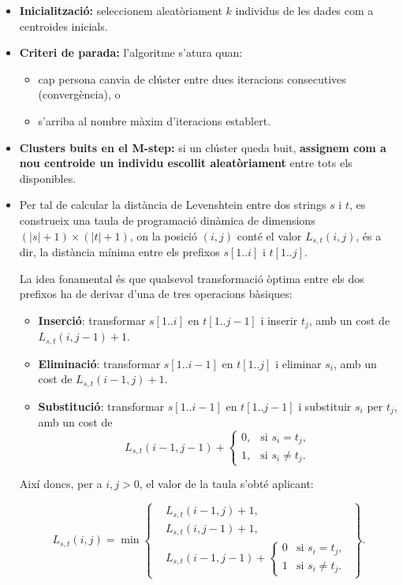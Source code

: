 \documentclass[a4paper,11pt]{article}
\begin{document}
\begin{itemize}
  \item \textbf{Inicialització:} seleccionem aleatòriament $k$ individus de les dades com a centroides inicials.
  \item \textbf{Criteri de parada:} l’algoritme s’atura quan:
  \begin{itemize}
    \item cap persona canvia de clúster entre dues iteracions consecutives (convergència), o
    \item s’arriba al nombre màxim d’iteracions establert.
  \end{itemize}
  \item \textbf{Clusters buits en el M-step:} si un clúster queda buit,
        \textbf{assignem com a nou centroide un individu escollit aleatòriament}
        entre tots els disponibles.
  \item Per tal de calcular la distància de Levenshtein entre dos strings $s$ i $t$,
es construeix una taula de programació dinàmica de dimensions 
$(|s|+1) \times (|t|+1)$, on la posició $(i,j)$ conté el valor
$L_{s,t}(i,j)$, és a dir, la distància mínima entre els prefixos
$s[1..i]$ i $t[1..j]$.

La idea fonamental és que qualsevol transformació òptima entre els dos
prefixos ha de derivar d’una de tres operacions bàsiques:

\begin{itemize}
    \item \textbf{Inserció}: transformar $s[1..i]$ en $t[1..j-1]$ i inserir $t_j$,
    amb un cost de $L_{s,t}(i,j-1)+1$.
    \item \textbf{Eliminació}: transformar $s[1..i-1]$ en $t[1..j]$ i eliminar $s_i$,
    amb un cost de $L_{s,t}(i-1,j)+1$.
    \item \textbf{Substitució}: transformar $s[1..i-1]$ en $t[1..j-1]$ i substituir
    $s_i$ per $t_j$, amb un cost de
    \[
    L_{s,t}(i-1,j-1) + 
    \begin{cases}
        0, & \text{si } s_i = t_j,\\
        1, & \text{si } s_i \neq t_j.
    \end{cases}
    \]
\end{itemize}

Així doncs, per a $i,j > 0$, el valor de la taula s’obté aplicant:

\[
L_{s,t}(i,j)=
\min\left\{
\begin{aligned}
    &L_{s,t}(i-1,j)+1,\\
    &L_{s,t}(i,j-1)+1,\\
    &L_{s,t}(i-1,j-1) + 
      \begin{cases}
          0 & \text{si } s_i = t_j,\\
          1 & \text{si } s_i \neq t_j.
      \end{cases}
\end{aligned}
\right\}.
\]


\end{itemize}
\end{document}
